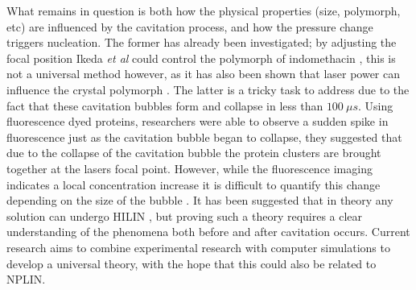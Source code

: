 What remains in question is both how the physical properties (size, 
polymorph, etc) are influenced by the cavitation process, and how 
the pressure change triggers nucleation. The former has already 
been investigated; by adjusting the focal position Ikeda \textit{et 
al} could control the polymorph of indomethacin \cite{Ikeda2015}, 
this is not a universal method however, as it has also been shown 
that laser power can influence the crystal polymorph \cite{Wang2010}. 
The latter is a tricky task to address due to the fact that these 
cavitation bubbles form and collapse in less than $100\ \mu s$. 
Using fluorescence dyed proteins, researchers were able to observe 
a sudden spike in fluorescence just as the cavitation bubble began 
to collapse, they suggested that due to the collapse of the cavitation 
bubble the protein clusters are brought together at the lasers focal 
point. However, while the fluorescence imaging indicates a local 
concentration increase it is difficult to quantify this change 
depending on the size of the bubble \cite{Korede2023}. It has been 
suggested that in theory any solution can undergo HILIN 
\cite{Korede2023}, but proving such a theory requires a clear 
understanding of the phenomena both before and after cavitation occurs. 
Current research aims to combine experimental research with computer 
simulations to develop a universal theory, with the hope that this 
could also be related to NPLIN.   

